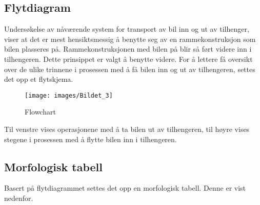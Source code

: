 \subsection{Flytdiagram}
\begin{flushleft}
Undersøkelse av nåværende system for transport av bil inn og ut av tilhenger, viser at det er mest hensiktsmessig å benytte seg av en rammekonstruksjon som bilen plasseres på. Rammekonstruksjonen med bilen på blir så ført videre inn i tilhengeren. Dette prinsippet er valgt å benytte videre. For å lettere få oversikt over de ulike trinnene i prosessen med å få bilen inn og ut av tilhengeren, settes det opp et flytskjema.
\end{flushleft}

\begin{figure}[H]
\begin{center}
\leavevmode
\texttt{[image: images/Bildet\_3]}
\end{center}
\caption{Flowchart}
\label{fig:flowchart}
\end{figure}

\begin{flushleft}
Til venstre vises operasjonene med å ta bilen ut av tilhengeren, til høyre vises stegene i prosessen med å flytte bilen inn i tilhengeren.\newpage

\subsection{Morfologisk tabell}
Basert på flytdiagrammet settes det opp en morfologisk tabell. Denne er vist nedenfor.
\end{flushleft}

